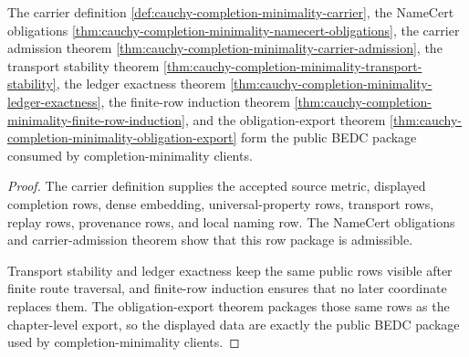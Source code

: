 \begin{theorem}
\label{thm:cauchy-completion-minimality-public-exported-package}
The carrier definition \autoref{def:cauchy-completion-minimality-carrier}, the NameCert obligations \autoref{thm:cauchy-completion-minimality-namecert-obligations}, the carrier admission theorem \autoref{thm:cauchy-completion-minimality-carrier-admission}, the transport stability theorem \autoref{thm:cauchy-completion-minimality-transport-stability}, the ledger exactness theorem \autoref{thm:cauchy-completion-minimality-ledger-exactness}, the finite-row induction theorem \autoref{thm:cauchy-completion-minimality-finite-row-induction}, and the obligation-export theorem \autoref{thm:cauchy-completion-minimality-obligation-export} form the public BEDC package consumed by completion-minimality clients.
\end{theorem}
\begin{proof}
The carrier definition supplies the accepted source metric, displayed completion rows, dense embedding, universal-property rows, transport rows, replay rows, provenance rows, and local naming row. The NameCert obligations and carrier-admission theorem show that this row package is admissible.

Transport stability and ledger exactness keep the same public rows visible after finite route traversal, and finite-row induction ensures that no later coordinate replaces them. The obligation-export theorem packages those same rows as the chapter-level export, so the displayed data are exactly the public BEDC package used by completion-minimality clients.
\end{proof}

